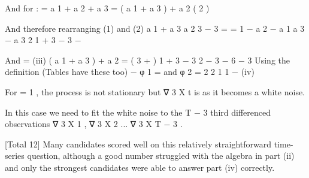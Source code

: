 \documentclass[a4paper,12pt]{article}
\begin{document}
And for  :
 = a 1  + a 2 + a 3 
 =
( a 1 + a 3 )  + a 2           ( 2 )

And therefore rearranging (1) and (2)
a 1 + a 3 a 2
3 \alpha  − 3 
=
=
1 − a 2 − a 1 a 3 − a 3 2 1 + 3  − 3  − 

And
 =
(iii)
( a 1 + a 3 )  + a 2 =
(
3 \alpha  + 
) 1 + 3  \alpha  − 3 
2
− 3 \alpha  − 
6
− 3 
Using the definition (Tables have these too)
\rho − 
φ 1 =   
and φ 2 = 2 2 1
1 − 
(iv)


For \alpha  = 1 , the process is not stationary but ∇ 3 X t is as it becomes a white
noise.

In this case we need to fit the white noise to the T − 3 third differenced
observations ∇ 3 X 1 , ∇ 3 X 2 ... ∇ 3 X T − 3 .

[Total 12]
Many candidates scored well on this relatively straightforward time-
series question, although a good number struggled with the algebra in
part (ii) and only the strongest candidates were able to answer part (iv)
correctly.
\end{document}
